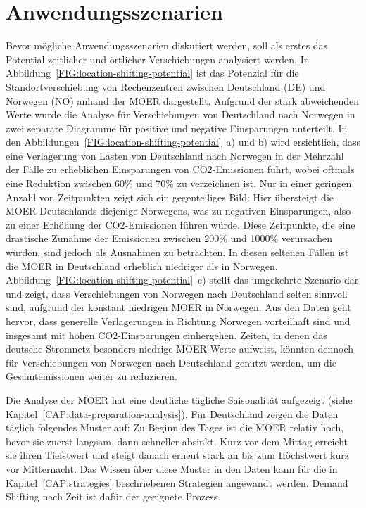 \section{Anwendungsszenarien}
Bevor mögliche Anwendungsszenarien diskutiert werden, soll als erstes das Potential zeitlicher und örtlicher Verschiebungen analysiert werden.
In Abbildung~\ref{FIG:location-shifting-potential} ist das Potenzial für die Standortverschiebung von Rechenzentren zwischen Deutschland (DE) und Norwegen (NO) anhand der \ac{MOER} dargestellt.
Aufgrund der stark abweichenden Werte wurde die Analyse für Verschiebungen von Deutschland nach Norwegen in zwei separate Diagramme für positive und negative Einsparungen unterteilt.
In den Abbildungen~\ref{FIG:location-shifting-potential}~a) und b) wird ersichtlich, dass eine Verlagerung von Lasten von Deutschland nach Norwegen in der Mehrzahl der Fälle zu erheblichen Einsparungen von CO2-Emissionen führt, wobei oftmals eine Reduktion zwischen 60\% und 70\% zu verzeichnen ist.
Nur in einer geringen Anzahl von Zeitpunkten zeigt sich ein gegenteiliges Bild:
Hier übersteigt die \ac{MOER} Deutschlands diejenige Norwegens, was zu negativen Einsparungen, also zu einer Erhöhung der CO2-Emissionen führen würde.
Diese Zeitpunkte, die eine drastische Zunahme der Emissionen zwischen 200\% und 1000\% verursachen würden, sind jedoch als Ausnahmen zu betrachten.
In diesen seltenen Fällen ist die \ac{MOER} in Deutschland erheblich niedriger als in Norwegen.
Abbildung~\ref{FIG:location-shifting-potential}~c) stellt das umgekehrte Szenario dar und zeigt, dass Verschiebungen von Norwegen nach Deutschland selten sinnvoll sind, aufgrund der konstant niedrigen \ac{MOER} in Norwegen.
Aus den Daten geht hervor, dass generelle Verlagerungen in Richtung Norwegen vorteilhaft sind und insgesamt mit hohen CO2-Einsparungen einhergehen.
Zeiten, in denen das deutsche Stromnetz besonders niedrige \ac{MOER}-Werte aufweist, könnten dennoch für Verschiebungen von Norwegen nach Deutschland genutzt werden, um die Gesamtemissionen weiter zu reduzieren.

Die Analyse der \ac{MOER} hat eine deutliche tägliche Saisonalität aufgezeigt (siehe Kapitel~\ref{CAP:data-preparation-analysis}).
Für Deutschland zeigen die Daten täglich folgendes Muster auf:
Zu Beginn des Tages ist die \ac{MOER} relativ hoch, bevor sie zuerst langsam, dann schneller absinkt.
Kurz vor dem Mittag erreicht sie ihren Tiefstwert und steigt danach erneut stark an bis zum Höchstwert kurz vor Mitternacht.
Das Wissen über diese Muster in den Daten kann für die in Kapitel~\ref{CAP:strategies} beschriebenen Strategien angewandt werden.
Demand Shifting nach Zeit ist dafür der geeignete Prozess.

